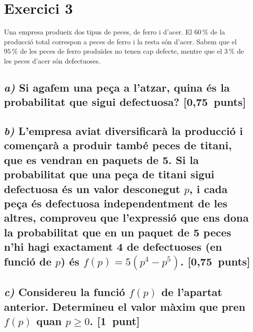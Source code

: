 \documentclass[11pt,a4paper]{article}
\begin{document}
\section*{\textcolor{blauPista}{Exercici 3}}

\noindent Una empresa produeix dos tipus de peces, de ferro i d'acer. El $60\,\%$ de la producció total correspon a peces de ferro i la resta són d'acer. Sabem que el $95\,\%$ de les peces de ferro produïdes no tenen cap defecte, mentre que el $3\,\%$ de les peces d'acer són defectuoses.

\subsection*{\textit{a)} \normalfont Si agafem una peça a l'atzar, quina és la probabilitat que sigui defectuosa? \hfill\textnormal{[0,75~punts]}}


\subsection*{\textit{b)} \normalfont L'empresa aviat diversificarà la producció i començarà a produir també peces de titani, que es vendran en paquets de 5. Si la probabilitat que una peça de titani sigui defectuosa és un valor desconegut $p$, i cada peça és defectuosa independentment de les altres, comproveu que l'expressió que ens dona la probabilitat que en un paquet de 5 peces n'hi hagi exactament 4 de defectuoses (en funció de $p$) és $f(p) = 5(p^{4} - p^{5})$. \hfill\textnormal{[0,75~punts]}}


\subsection*{\textit{c)} \normalfont Considereu la funció $f(p)$ de l'apartat anterior. Determineu el valor màxim que pren $f(p)$ quan $p \geq 0$. \hfill\textnormal{[1~punt]}}


\vspace{0.6em}
\end{document}
